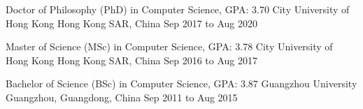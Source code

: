 
\begin{cventries}
  \cventry
    {Doctor of Philosophy (PhD) in Computer Science, GPA: 3.70} %
    {City University of Hong Kong} %
    {Hong Kong SAR, China} %
    {Sep 2017 to Aug 2020} %
    {
    }
\end{cventries}


\begin{cventries}
  \cventry
    {Master of Science (MSc) in Computer Science, GPA: 3.78} %
    {City University of Hong Kong} %
    {Hong Kong SAR, China} %
    {Sep 2016 to Aug 2017} %
    {
    }
\end{cventries}


\begin{cventries}
  \cventry
    {Bachelor of Science (BSc) in Computer Science, GPA: 3.87} %
    {Guangzhou University} %
    {Guangzhou, Guangdong, China} %
    {Sep 2011 to Aug 2015} %
    {
    }
\end{cventries}
